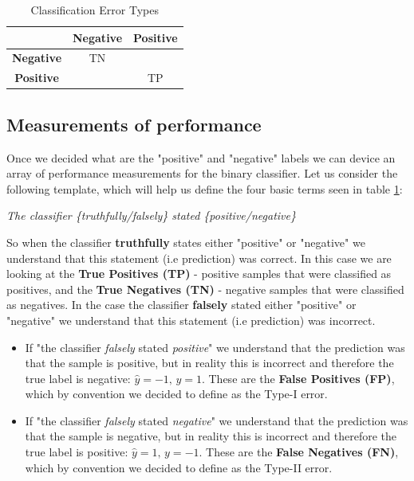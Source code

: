 \begin{table}[h!] %
\begin{center}
	\caption{Classification Error Types}
	\label{tab:error_types}
	\begin{tabular}{|c|c|c|} \hline
		\diagbox[width=3.5cm]{\textbf{Prediction}}{\textbf{Actual}} & \textbf{Negative} & \textbf{Positive} \\ \hline \hline
		\textbf{Negative}  & TN  & \vtop{\hbox{\strut\textbf{FN}} \hbox{\strut{\color{blue} Type-II Error}}} \\ \hline
		\textbf{Positive}  & \vtop{\hbox{\strut\textbf{FP}} \hbox{\strut{\color{red} Type-I Error}}} & TP \\ \hline
	\end{tabular}	
\end{center}
\end{table}

\subsection{Measurements of performance}
Once we decided what are the "positive" and "negative" labels we can device an array of performance measurements for the binary classifier. Let us consider the following template, which will help us define the four basic terms seen in table \ref{tab:error_types}:
\begin{center}
	\textit{The classifier \{truthfully/falsely\} stated \{positive/negative\}}
\end{center}

So when the classifier \textbf{truthfully} states either "positive" or "negative" we understand that this statement (i.e prediction) was correct. In this case we are looking at the \textbf{True Positives (TP)} - positive samples that were classified as positives, and the \textbf{True Negatives (TN)} - negative samples that were classified as negatives. In the case the classifier \textbf{falsely} stated either "positive" or "negative" we understand that this statement (i.e prediction) was incorrect.
\begin{itemize}
	\item If "the classifier \textit{falsely} stated \textit{positive}" we understand that the prediction was that the sample is positive, but in reality this is incorrect and therefore the true label is negative: $\widehat{y}=-1,\, y=1$. These are the \textbf{False Positives (FP)}, which by convention we decided to define as the Type-I error.
	\item If "the classifier \textit{falsely} stated \textit{negative}" we understand that the prediction was that the sample is negative, but in reality this is incorrect and therefore the true label is positive: $\widehat{y}=1,\, y=-1$. These are the \textbf{False Negatives (FN)}, which by convention we decided to define as the Type-II error.
\end{itemize}

